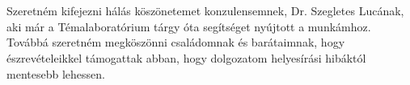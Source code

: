 \chapter*{\koszonetnyilvanitas}

Szeretném kifejezni hálás köszönetemet konzulensemnek, Dr. Szegletes Lucának, aki már a Témalaboratórium tárgy óta segítséget nyújtott a munkámhoz. Továbbá szeretném megköszönni családomnak és barátaimnak, hogy észrevételeikkel támogattak abban, hogy dolgozatom helyesírási hibáktól mentesebb lehessen.